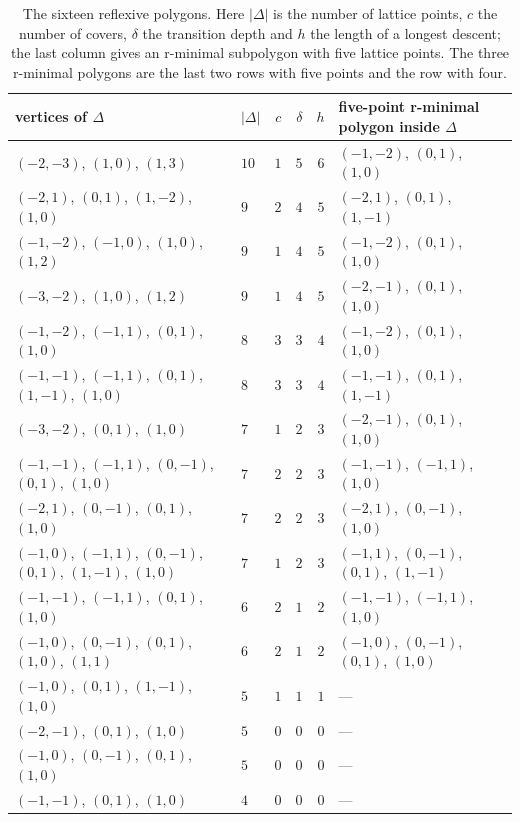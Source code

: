 \documentclass[11pt]{amsart}
\theoremstyle{definition}
\theoremstyle{remark}
\begin{document}
\begin{table}[t]
\caption{The sixteen reflexive polygons. Here $|\Delta|$ is the number of
lattice points, $c$ the number of covers, $\delta$ the transition depth and
$h$ the length of a longest descent; the last column gives an r-minimal
subpolygon with five lattice points. The three r-minimal polygons are the
last two rows with five points and the row with four.}\label{tab:twod}
\centering
\begin{tabular}{llrrrl}
\toprule
vertices of $\Delta$ & $|\Delta|$ & $c$ & $\delta$ & $h$ & five-point r-minimal polygon inside $\Delta$\\
\midrule
$(-2,-3)$, $(1,0)$, $(1,3)$ & $10$ & $1$ & $5$ & $6$ & $(-1,-2)$, $(0,1)$, $(1,0)$\\
$(-2,1)$, $(0,1)$, $(1,-2)$, $(1,0)$ & $9$ & $2$ & $4$ & $5$ & $(-2,1)$, $(0,1)$, $(1,-1)$\\
$(-1,-2)$, $(-1,0)$, $(1,0)$, $(1,2)$ & $9$ & $1$ & $4$ & $5$ & $(-1,-2)$, $(0,1)$, $(1,0)$\\
$(-3,-2)$, $(1,0)$, $(1,2)$ & $9$ & $1$ & $4$ & $5$ & $(-2,-1)$, $(0,1)$, $(1,0)$\\
$(-1,-2)$, $(-1,1)$, $(0,1)$, $(1,0)$ & $8$ & $3$ & $3$ & $4$ & $(-1,-2)$, $(0,1)$, $(1,0)$\\
$(-1,-1)$, $(-1,1)$, $(0,1)$, $(1,-1)$, $(1,0)$ & $8$ & $3$ & $3$ & $4$ & $(-1,-1)$, $(0,1)$, $(1,-1)$\\
$(-3,-2)$, $(0,1)$, $(1,0)$ & $7$ & $1$ & $2$ & $3$ & $(-2,-1)$, $(0,1)$, $(1,0)$\\
$(-1,-1)$, $(-1,1)$, $(0,-1)$, $(0,1)$, $(1,0)$ & $7$ & $2$ & $2$ & $3$ & $(-1,-1)$, $(-1,1)$, $(1,0)$\\
$(-2,1)$, $(0,-1)$, $(0,1)$, $(1,0)$ & $7$ & $2$ & $2$ & $3$ & $(-2,1)$, $(0,-1)$, $(1,0)$\\
$(-1,0)$, $(-1,1)$, $(0,-1)$, $(0,1)$, $(1,-1)$, $(1,0)$ & $7$ & $1$ & $2$ & $3$ & $(-1,1)$, $(0,-1)$, $(0,1)$, $(1,-1)$\\
$(-1,-1)$, $(-1,1)$, $(0,1)$, $(1,0)$ & $6$ & $2$ & $1$ & $2$ & $(-1,-1)$, $(-1,1)$, $(1,0)$\\
$(-1,0)$, $(0,-1)$, $(0,1)$, $(1,0)$, $(1,1)$ & $6$ & $2$ & $1$ & $2$ & $(-1,0)$, $(0,-1)$, $(0,1)$, $(1,0)$\\
$(-1,0)$, $(0,1)$, $(1,-1)$, $(1,0)$ & $5$ & $1$ & $1$ & $1$ & ---\\
$(-2,-1)$, $(0,1)$, $(1,0)$ & $5$ & $0$ & $0$ & $0$ & ---\\
$(-1,0)$, $(0,-1)$, $(0,1)$, $(1,0)$ & $5$ & $0$ & $0$ & $0$ & ---\\
$(-1,-1)$, $(0,1)$, $(1,0)$ & $4$ & $0$ & $0$ & $0$ & ---\\
\bottomrule
\end{tabular}
\end{table}
\end{document}
